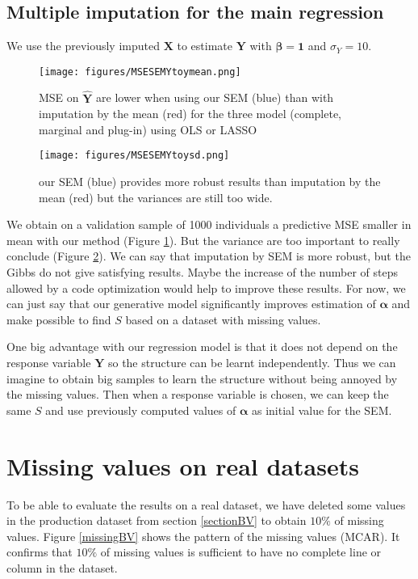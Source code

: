 \documentclass[12pt,a4paper]{report}
\begin{document}
		\subsection{Multiple imputation for the main regression}
		We use the previously imputed $\boldsymbol{X}$ to estimate $\boldsymbol{Y}$ with $\boldsymbol{\beta}=\boldsymbol{1}$ and $\sigma_Y=10$.
			\begin{figure}[h!]
	\centering
	\texttt{[image: figures/MSESEMYtoymean.png]} 
	\caption{MSE on $\hat{\boldsymbol{Y}}$ are lower when using our SEM (blue) than with imputation by the mean (red) for the three model (complete, marginal and plug-in) using OLS or LASSO}\label{MSESEMYtoymean}
\end{figure}	

			\begin{figure}[h!]
	\centering
	\texttt{[image: figures/MSESEMYtoysd.png]} 
	\caption{our SEM (blue) provides more robust results than imputation by the mean (red) but the variances are still too wide.}\label{MSESEMYtoysd}
\end{figure}		
We obtain on a validation sample of 1000 individuals a predictive MSE smaller in mean with our method (Figure \ref{MSESEMYtoymean}). But the variance are too important to really conclude (Figure \ref{MSESEMYtoysd}). We can say that imputation by SEM is more robust, but the Gibbs do not give satisfying results. Maybe the increase of the number of steps allowed by a code optimization would help to improve these results. For now, we can just say that our generative model significantly improves estimation of $\boldsymbol{\alpha}$ and make possible to find $S$ based on a dataset with missing values.

		One big advantage with our regression model is that it does not depend on the response variable $\boldsymbol{Y}$ so the structure can be learnt independently. Thus we can imagine to obtain big samples to learn the structure without being annoyed by the missing values. Then when a response variable is chosen, we can keep the same $S$ and use previously computed values of $\boldsymbol{\alpha}$ as initial value for the SEM. 

	\section{Missing values on real datasets}	
		To be able to evaluate the results on a real dataset, we have deleted some values in the production dataset from section \ref{sectionBV} to obtain $10\%$ of missing values. Figure \ref{missingBV} shows the pattern of the missing values (MCAR). It confirms that $10\%$ of missing values is sufficient to have no complete line or column in the dataset. 
	
\end{document}
